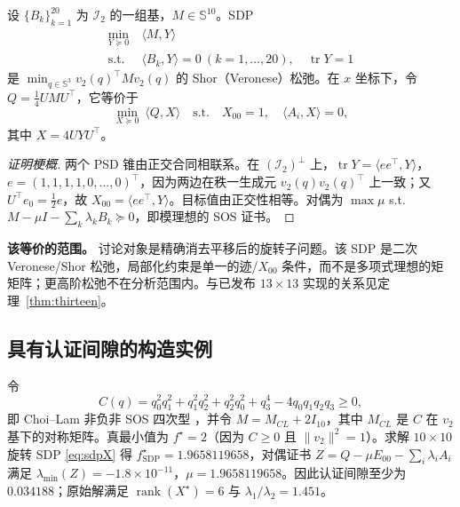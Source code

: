 \begin{theorem}\label{thm:sdp}
设 $\{B_k\}_{k=1}^{20}$ 为 $\mathcal{I}_2$ 的一组基，$M\in\mathbb{S}^{10}$。SDP
\begin{equation}
\begin{split}
\min_{Y\succeq0}\ &\langle M,Y\rangle\\
\text{s.t.}\ &\langle B_k,Y\rangle=0\ (k=1,\dots,20),\quad \operatorname{tr}Y=1
\end{split}
\label{eq:sdpY}
\end{equation}
是 $\min_{q\in\mathbb{S}^3}v_2(q)^\top Mv_2(q)$ 的 Shor（Veronese）松弛。在 $x$ 坐标下，令 $Q=\tfrac14UMU^\top$，它等价于
\begin{equation}
\min_{X\succeq0}\ \langle Q,X\rangle\quad\text{s.t.}\quad X_{00}=1,\quad \langle A_i,X\rangle=0,
\label{eq:sdpX}
\end{equation}
其中 $X=4UYU^\top$。
\end{theorem}

\begin{proof}[证明梗概]
两个 PSD 锥由正交合同相联系。在 $(\mathcal{I}_2)^\perp$ 上，$\operatorname{tr}Y=\langle ee^\top,Y\rangle$，$e=(1,1,1,1,0,\dots,0)^\top$，因为两边在秩一生成元 $v_2(q)v_2(q)^\top$ 上一致；又 $U^\top e_0=\tfrac12e$，故 $X_{00}=\langle ee^\top,Y\rangle$。目标值由正交性相等。对偶为 $\max\mu$ s.t. $M-\mu I-\sum_k\lambda_kB_k\succeq0$，即模理想的 SOS 证书。
\end{proof}

\textbf{该等价的范围。} 讨论对象是精确消去平移后的旋转子问题。该 SDP 是二次 Veronese/Shor 松弛，局部化约束是单一的迹/$X_{00}$ 条件，而不是多项式理想的矩矩阵；更高阶松弛不在分析范围内。与已发布 $13\times13$ 实现的关系见定理~\ref{thm:thirteen}。

\subsection{具有认证间隙的构造实例}\label{sec:example}

\begin{example}\label{ex:choilam}
令
\begin{equation}
C(q)=q_0^2q_1^2+q_1^2q_2^2+q_2^2q_0^2+q_3^4-4q_0q_1q_2q_3\ge0,
\label{eq:choilam}
\end{equation}
即 Choi--Lam 非负非 SOS 四次型 \cite{choi1977extremal,choi1980zeros}，并令 $M=M_{CL}+2I_{10}$，其中 $M_{CL}$ 是 $C$ 在 $v_2$ 基下的对称矩阵。真最小值为 $f^\star=2$（因为 $C\ge0$ 且 $\|v_2\|^2=1$）。求解 $10\times10$ 旋转 SDP \eqref{eq:sdpX} 得 $f^\star_{\mathrm{SDP}}=1.9658119658$，对偶证书 $Z=Q-\mu E_{00}-\sum_i\lambda_iA_i$ 满足 $\lambda_{\min}(Z)=-1.8\times10^{-11}$，$\mu=1.9658119658$。因此认证间隙至少为 $0.034188$；原始解满足 $\operatorname{rank}(X^\star)=6$ 与 $\lambda_1/\lambda_2=1.451$。
\end{example}

